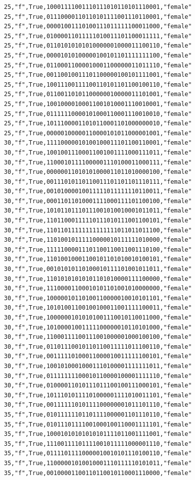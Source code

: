 \documentclass[authoryearcitations]{UoYCSproject}
\begin{document}
\begin{framed}
\begin{verbatim}
25,"f",True,10001111001110111010110101110001,"female"
25,"f",True,01110000110110101111001110110001,"female"
25,"f",True,00001001110100111011111100011000,"female"
25,"f",True,01000011011111010011101100011111,"female"
25,"f",True,01101010101010000001000011100110,"female"
25,"f",True,00001010100000100101101111111100,"female"
25,"f",True,01100011000010001100000011011110,"female"
25,"f",True,00110010011101100000100101111001,"female"
25,"f",True,10011100111100110101101100100110,"female"
25,"f",True,01100110101100000010000011101001,"female"
25,"f",True,10010000100011001010001110010001,"female"
25,"f",True,01111110000101000110001110010010,"female"
25,"f",True,10111000011010110001101000000010,"female"
25,"f",True,00000100000110000101011000001001,"female"
30,"f",True,11110000010100100011101100110001,"female"
30,"f",True,10010011100011001001111000111011,"female"
30,"f",True,11000101111000001110100011000111,"female"
30,"f",True,00000011010101000011011010000100,"female"
30,"f",True,00111010110110011101101101110111,"female"
30,"f",True,00101000010011111011111110110011,"female"
30,"f",True,00011011010001111000111101100100,"female"
30,"f",True,10101101110111001010010001011011,"female"
30,"f",True,11011000111110111010111001100101,"female"
30,"f",True,11011011111111111111011011011100,"female"
30,"f",True,11010010111110000010111111010000,"female"
30,"f",True,11111000011101100110011001110100,"female"
30,"f",True,11010010001100101101010010100101,"female"
30,"f",True,00101010110100010111101001011011,"female"
30,"f",True,11010101010101101010000111100000,"female"
30,"f",True,11100001100010101101001010000000,"female"
30,"f",True,10000010110100110000010010101101,"female"
30,"f",True,10101001100100100011001111100011,"female"
30,"f",True,10000001010101001110010110011000,"female"
30,"f",True,10100001001111100000010110101000,"female"
30,"f",True,11000111100111001000001000100100,"female"
30,"f",True,01101110010110110011111011100110,"female"
30,"f",True,00111110100011000010011111100101,"female"
30,"f",True,10010100010001110100001111111011,"female"
30,"f",True,01111111100010110000100001111110,"female"
30,"f",True,01000011010111011100100111000101,"female"
30,"f",True,10111010111101000001111010011101,"female"
30,"f",True,00111111010111100000001011101110,"female"
35,"f",True,01011111101101111000001101110110,"female"
35,"f",True,01011101111001000100110001111101,"female"
35,"f",True,10001010101010101111011001111001,"female"
35,"f",True,11100111101111001011111000001110,"female"
35,"f",True,01111011110000010010101110100110,"female"
35,"f",True,11000001010010001110111110101011,"female"
35,"f",True,00100001100110110010110001110000,"female"

\end{verbatim}
\end{framed}
\end{document}
